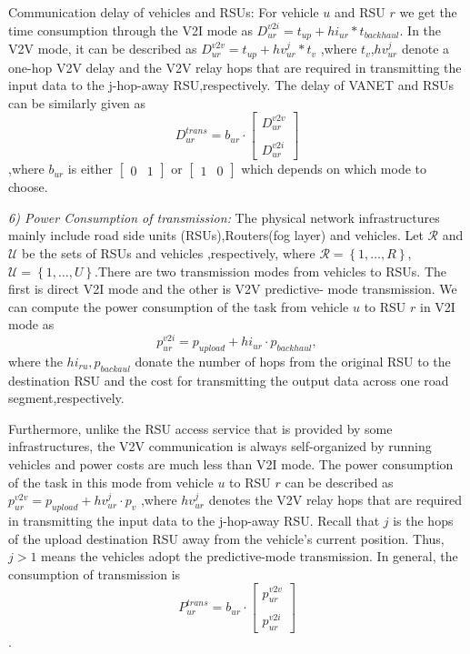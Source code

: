 \documentclass[journal]{IEEEtran}
\begin{document}
Communication delay of vehicles and RSUs: For vehicle $u$ and RSU $r$ we get the time consumption through the V2I mode as $D_{ur}^{v2i} = t_{up}+hi_{ur}*t_{backhaul}$. In the V2V mode, it can be described as $ D_{ur}^{v2v} = t_{up}+hv_{ur}^{j}*t_{v} $ ,where $t_v$,$hv_{ur}^j$ denote a one-hop V2V delay and the V2V relay hops that are required in transmitting the input data to the j-hop-away RSU,respectively.
The delay of VANET and RSUs can be similarly given as 
$$
D_{ur}^{trans} = b_{ur} \cdot \begin{bmatrix}
D_{ur}^{v2v} \\
\\
D_{ur}^{v2i}
\end{bmatrix} 
$$
,where $b_{ur}$ is either $\begin{bmatrix}
0 & 1 
\end{bmatrix} $ or $\begin{bmatrix}
1 & 0 
\end{bmatrix} $ which depends on which mode to choose. 

\textit{6) Power Consumption of transmission:} The physical network infrastructures mainly include road side units (RSUs),Routers(fog layer) and vehicles. Let $\mathcal{R}$ and $\mathcal{U}$  be the sets of RSUs and vehicles ,respectively, where $\mathcal{R}=\left\{1,\ldots,R\right\}$,$\mathcal{U}=\left\{1,\ldots,U\right\}$.There are two transmission modes from vehicles to RSUs. The first is direct V2I mode and the other is V2V predictive-
mode transmission. We can compute the power consumption of the task from vehicle $u$ to RSU $r$ in V2I mode as 
$$p_{ur}^{v2i} = p_{upload} + hi_{ur} \cdot p_{backhaul},$$ 
where the $hi_{ru},p_{backaul}$ donate the number of hops from the original RSU to the destination RSU and the cost for transmitting the output data across one road segment,respectively. 

Furthermore, unlike the RSU access service that is provided by some infrastructures, the V2V communication is always self-organized by running vehicles and power costs are much less than V2I mode. The power consumption of the task in this mode from vehicle $u$ to RSU $r$ can be described as $p_{ur}^{v2v} = p_{upload}+hv_{ur}^j \cdot p_{v}$  ,where $hv_{ur}^j$ denotes the V2V relay hops that are required in transmitting the input data to the j-hop-away RSU. Recall that $j$ is the hops of the upload destination RSU away from the vehicle's current position. Thus,$j>1$ means the vehicles adopt the predictive-mode transmission.%
In general, the consumption of transmission is  
$$ P_{ur}^{trans} = b_{ur} \cdot \begin{bmatrix}
p_{ur}^{v2v} \\
\\
p_{ur}^{v2i}
\end{bmatrix} $$.
\end{document}
